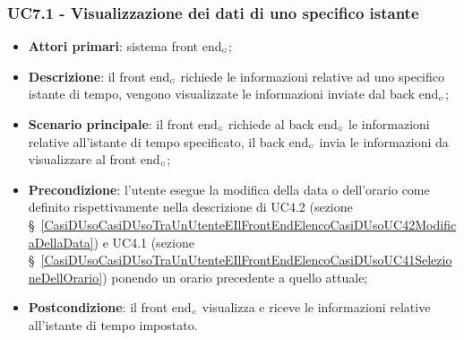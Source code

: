 \subsubsection{UC7.1 - Visualizzazione dei dati di uno specifico istante}\label{CasiDUsoCasiDUsoTraIlFrontEndEIlBackEndElencoDeiCasiDUsoUC71VisualizzazioneDeiDatiDiUnoSpecificoIstante}
\begin{itemize}
	\item \textbf{Attori primari}: sistema front end$_{\scaleto{G}{3pt}}$;
	\item \textbf{Descrizione}: il front end$_{\scaleto{G}{3pt}}$ richiede le informazioni relative ad uno specifico istante di tempo, vengono visualizzate le informazioni inviate dal back end$_{\scaleto{G}{3pt}}$;
	\item \textbf{Scenario principale}:  il front end$_{\scaleto{G}{3pt}}$ richiede al back end$_{\scaleto{G}{3pt}}$ le informazioni relative all'istante di tempo specificato, il back end$_{\scaleto{G}{3pt}}$ invia le informazioni da visualizzare al front end$_{\scaleto{G}{3pt}}$;
	\item \textbf{Precondizione}: l’utente esegue la modifica della data o dell’orario come definito rispettivamente nella descrizione di UC4.2 (sezione \S~\ref{CasiDUsoCasiDUsoTraUnUtenteEIlFrontEndElencoCasiDUsoUC42ModificaDellaData}) e UC4.1 (sezione \S~\ref{CasiDUsoCasiDUsoTraUnUtenteEIlFrontEndElencoCasiDUsoUC41SelezioneDellOrario}) ponendo un orario precedente a quello attuale;
	\item \textbf{Postcondizione}: il front end$_{\scaleto{G}{3pt}}$ visualizza e riceve le informazioni relative all'istante di tempo impostato. 
\end{itemize}

